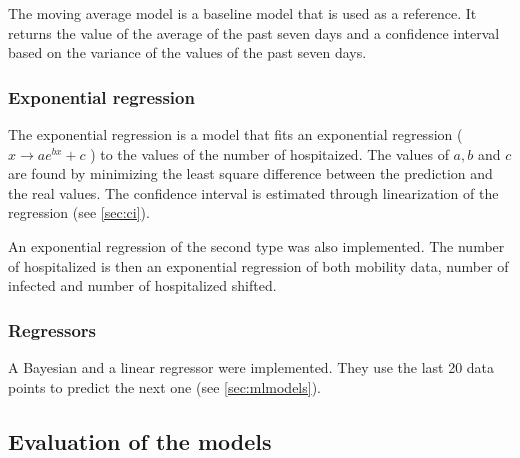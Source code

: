 The moving average model is a baseline model that is used as a reference. 
It returns the value of the average of the past seven days and a confidence interval based on the variance of the values of the past seven days. 


\subsubsection{Exponential regression}

The exponential regression is a model that fits an exponential regression ($x \rightarrow a e^{b x} + c$ ) to the values of the number of hospitaized. 
The values of $a, b$ and $c$ are found by minimizing the least square difference between the prediction and the real values. 
The confidence interval is estimated through linearization of the regression (see \ref{sec:ci}). 

An exponential regression of the second type was also implemented. 
The number of hospitalized is then an exponential regression of both mobility data, number of infected and number of hospitalized shifted. 


\subsubsection{Regressors}

A Bayesian and a linear regressor were implemented.
They use the last 20 data points to predict the next one (see \ref{sec:mlmodels}). 


\subsection*{Evaluation of the models}

